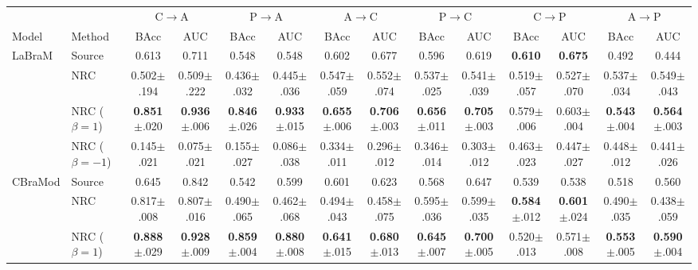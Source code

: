 \documentclass[letterpaper]{article} %
\begin{document}
\begin{table}[!t]
    \centering
    \setlength{\tabcolsep}{1.2pt}
    \renewcommand{\arraystretch}{1.1}
    \begin{tabular}{ll cc cc cc cc cc cc}
    \toprule
    & & \multicolumn{2}{c}{C$\to$A} & \multicolumn{2}{c}{P$\to$A} & \multicolumn{2}{c}{A$\to$C} & \multicolumn{2}{c}{P$\to$C} & \multicolumn{2}{c}{C$\to$P} & \multicolumn{2}{c}{A$\to$P} \\
    \cmidrule(lr){3-4}\cmidrule(lr){5-6}\cmidrule(lr){7-8}\cmidrule(lr){9-10}\cmidrule(lr){11-12}\cmidrule(lr){13-14}
    Model & Method & BAcc & AUC & BAcc & AUC & BAcc & AUC & BAcc & AUC & BAcc & AUC & BAcc & AUC \\
    \midrule
    LaBraM & Source & 0.613 & 0.711 & 0.548 & 0.548 & 0.602 & 0.677 & 0.596 & 0.619 & \textbf{0.610} & \textbf{0.675} & 0.492 & 0.444 \\
     & NRC & 0.502{$\pm$.194} & 0.509{$\pm$.222} & 0.436{$\pm$.032} & 0.445{$\pm$.036} & 0.547{$\pm$.059} & 0.552{$\pm$.074} & 0.537{$\pm$.025} & 0.541{$\pm$.039} & 0.519{$\pm$.057} & 0.527{$\pm$.070} & 0.537{$\pm$.034} & 0.549{$\pm$.043} \\
     & NRC ($\beta{=}1$) & \textbf{0.851}{$\pm$.020} & \textbf{0.936}{$\pm$.006} & \textbf{0.846}{$\pm$.026} & \textbf{0.933}{$\pm$.015} & \textbf{0.655}{$\pm$.006} & \textbf{0.706}{$\pm$.003} & \textbf{0.656}{$\pm$.011} & \textbf{0.705}{$\pm$.003} & 0.579{$\pm$.006} & 0.603{$\pm$.004} & \textbf{0.543}{$\pm$.004} & \textbf{0.564}{$\pm$.003} \\
     & NRC ($\beta{=}{-}1$) & 0.145{$\pm$.021} & 0.075{$\pm$.021} & 0.155{$\pm$.027} & 0.086{$\pm$.038} & 0.334{$\pm$.011} & 0.296{$\pm$.012} & 0.346{$\pm$.014} & 0.303{$\pm$.012} & 0.463{$\pm$.023} & 0.447{$\pm$.027} & 0.448{$\pm$.012} & 0.441{$\pm$.026} \\
    \midrule
    CBraMod & Source & 0.645 & 0.842 & 0.542 & 0.599 & 0.601 & 0.623 & 0.568 & 0.647 & 0.539 & 0.538 & 0.518 & 0.560 \\
     & NRC & 0.817{$\pm$.008} & 0.807{$\pm$.016} & 0.490{$\pm$.065} & 0.462{$\pm$.068} & 0.494{$\pm$.043} & 0.458{$\pm$.075} & 0.595{$\pm$.036} & 0.599{$\pm$.035} & \textbf{0.584}{$\pm$.012} & \textbf{0.601}{$\pm$.024} & 0.490{$\pm$.035} & 0.438{$\pm$.059} \\
     & NRC ($\beta{=}1$) & \textbf{0.888}{$\pm$.029} & \textbf{0.928}{$\pm$.009} & \textbf{0.859}{$\pm$.004} & \textbf{0.880}{$\pm$.008} & \textbf{0.641}{$\pm$.015} & \textbf{0.680}{$\pm$.013} & \textbf{0.645}{$\pm$.007} & \textbf{0.700}{$\pm$.005} & 0.520{$\pm$.013} & 0.571{$\pm$.008} & \textbf{0.553}{$\pm$.005} & \textbf{0.590}{$\pm$.004} \\

\end{tabular}
\end{table}
\end{document}
